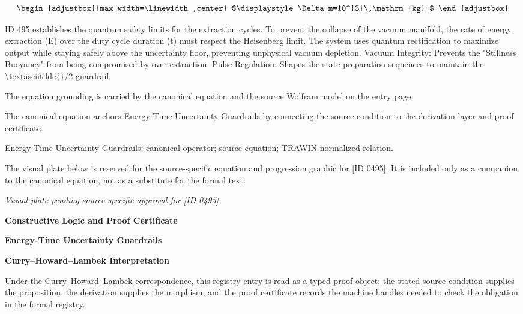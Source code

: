 \[
\begin{adjustbox}{max width=\linewidth,center}
$\displaystyle
\Delta m=10^{3}\,\mathrm{kg}
$
\end{adjustbox}
\]

ID 495 establishes the quantum safety limits for the extraction cycles. To prevent the collapse of the vacuum manifold, the rate of energy extraction (E) over the duty cycle duration (t) must respect the Heisenberg limit. The system uses quantum rectification to maximize output while staying safely above the uncertainty floor, preventing unphysical vacuum depletion. Vacuum Integrity: Prevents the "Stillness Buoyancy" from being compromised by over extraction. Pulse Regulation: Shapes the state preparation sequences to maintain the \textbackslash{}textasciitilde\{\}/2 guardrail.

The equation grounding is carried by the canonical equation and the source Wolfram model on the entry page.

The canonical equation anchors Energy-Time Uncertainty Guardrails by connecting the source condition to the derivation layer and proof certificate.

Energy-Time Uncertainty Guardrails; canonical operator; source equation; TRAWIN-normalized relation.
\endgroup

\begingroup\footnotesize\sloppy
The visual plate below is reserved for the source-specific equation and progression graphic for [ID 0495]. It is included only as a companion to the canonical equation, not as a substitute for the formal text.
\par\endgroup
\begingroup\footnotesize\itshape
Visual plate pending source-specific approval for [ID 0495].
\par\endgroup

\clearpage
\begingroup\tzpsupportsetup
\noindent\textbf{\fontsize{10.8pt}{12.8pt}\selectfont [ID 0495] Constructive Logic and Proof Certificate}\par
\noindent\textbf{\fontsize{10pt}{12pt}\selectfont Energy-Time Uncertainty Guardrails}\par
\vspace{0.45em}
\begingroup
\footnotesize
\setlength{\parskip}{0.22em}
\setlength{\parindent}{0pt}
\noindent\textbf{Curry--Howard--Lambek Interpretation}\par
Under the Curry--Howard--Lambek correspondence, this registry entry is read as a typed proof
object: the stated source condition supplies the proposition, the derivation supplies the
morphism, and the proof certificate records the machine handles needed to check the obligation
in the formal registry.

